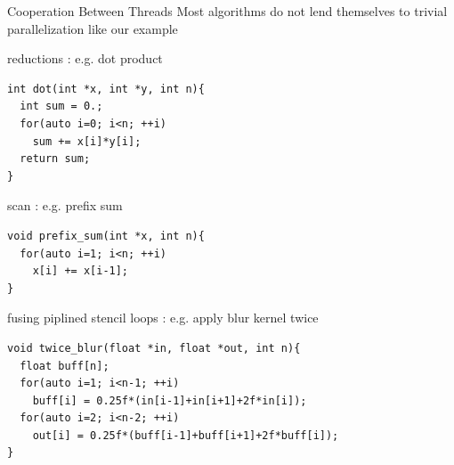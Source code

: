 
\begin{frame}[fragile]{Cooperation Between Threads}
    \centering
    Most algorithms do not lend themselves to trivial parallelization like our \axpy example

    \begin{code}{reductions : e.g. dot product}
        \begin{lstlisting}[style=boxcudatiny]
int dot(int *x, int *y, int n){
  int sum = 0.;
  for(auto i=0; i<n; ++i)
    sum += x[i]*y[i];
  return sum;
}
        \end{lstlisting}
    \end{code}
\vspace{-7pt}
        \begin{code}{scan : e.g. prefix sum}
            \begin{lstlisting}[style=boxcudatiny]
void prefix_sum(int *x, int n){
  for(auto i=1; i<n; ++i)
    x[i] += x[i-1];
}
        \end{lstlisting}
    \end{code}
\vspace{-7pt}
    \begin{code}{fusing piplined stencil loops : e.g. apply blur kernel twice}
        \begin{lstlisting}[style=boxcudatiny]
void twice_blur(float *in, float *out, int n){
  float buff[n];
  for(auto i=1; i<n-1; ++i)
    buff[i] = 0.25f*(in[i-1]+in[i+1]+2f*in[i]);
  for(auto i=2; i<n-2; ++i)
    out[i] = 0.25f*(buff[i-1]+buff[i+1]+2f*buff[i]);
}
        \end{lstlisting}
    \end{code}

\end{frame}

